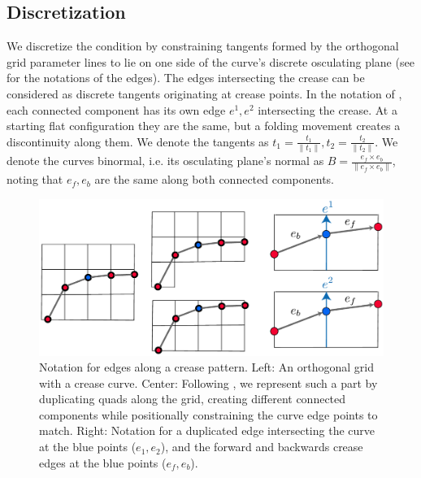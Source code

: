 \subsection{Discretization}
We discretize the condition by constraining tangents formed by the orthogonal grid parameter lines to lie on one side of the curve's discrete osculating plane (see  for the notations of the edges). The edges intersecting the crease can be considered as discrete tangents originating at crease points. In the notation of , each connected component has its own edge $e^1,e^2$ intersecting the crease. At a starting flat configuration they are the same, but a folding movement creates a discontinuity along them. We denote the tangents as $t_1 = \frac{t_1}{\|t_1\|}, t_2 = \frac{t_2}{\|t_2\|}$. We denote the curves binormal, i.e. its osculating plane's normal as $B = \frac{e_f \times e_b}{\|e_f \times e_b\|}$, noting that $e_f,e_b$ are the same along both connected components.

\begin{figure} [h]
	\centering
	\includegraphics[width=\linewidth]{figures/osc_plane_discretization}
	\caption{Notation for edges along a crease pattern. Left: An orthogonal grid with a crease curve. Center: Following \cite{rabi2018shape}, we represent such a part by duplicating quads along the grid, creating different connected components while positionally constraining the curve edge points to match. Right: Notation for a duplicated edge intersecting the curve at the blue points ($e_1,e_2$), and the forward and backwards crease edges at the blue points ($e_f,e_b$). }
	\label{fig:osc_plane_discretization}
\end{figure}

